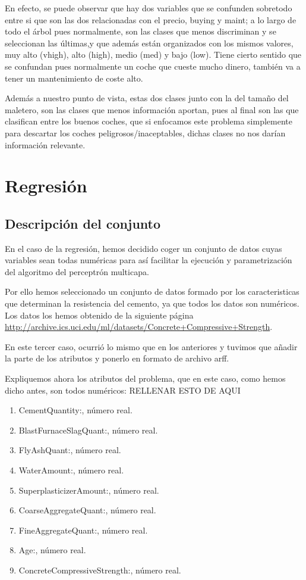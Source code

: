 \documentclass[a4paper, 11pt, twoside, openany, onecolumn, final]{memoir}
\begin{document}
	En efecto, se puede observar que hay dos variables que se confunden sobretodo entre si que son las dos relacionadas con el precio, buying y maint; a lo largo de todo el árbol pues normalmente, son las clases que menos discriminan y se seleccionan las últimas,y que además están organizados con los mismos valores, muy alto (vhigh), alto (high), medio (med) y bajo (low). Tiene cierto sentido que se confundan pues normalmente un coche que cueste mucho dinero, también va a tener un mantenimiento de coste alto. 
	
	Además a nuestro punto de vista, estas dos clases junto con la del tamaño del maletero, son las clases que menos información aportan, pues al final son las que clasifican entre los buenos coches, que si enfocamos este problema simplemente para descartar los coches peligrosos/inaceptables, dichas clases no nos darían información relevante.
	
\chapter{Regresión}
	\section{Descripción del conjunto}
	En el caso de la regresión, hemos decidido coger un conjunto de datos cuyas variables sean todas numéricas para así facilitar la ejecución y parametrización del algoritmo del perceptrón multicapa. 
	
	Por ello hemos seleccionado un conjunto de datos formado por los caracteristicas que determinan la resistencia del cemento, ya que todos los datos son numéricos.
	Los datos los hemos obtenido de la siguiente página \url{http://archive.ics.uci.edu/ml/datasets/Concrete+Compressive+Strength}.
	
	En este tercer caso, ocurrió lo mismo que en los anteriores y tuvimos que añadir la parte de los atributos y ponerlo en formato de archivo arff.
	
	Expliquemos ahora los atributos del problema, que en este caso, como hemos dicho antes, son todos numéricos:
	RELLENAR ESTO DE AQUI
	\begin{enumerate}
\item CementQuantity:, número real.
\item BlastFurnaceSlagQuant:, número real.
\item FlyAshQuant:, número real.
\item WaterAmount:, número real.
\item SuperplasticizerAmount:, número real.
\item CoarseAggregateQuant:, número real.
\item FineAggregateQuant:, número real.
\item Age:, número real.
\item ConcreteCompressiveStrength:, número real.
\end{enumerate}
\end{document}
